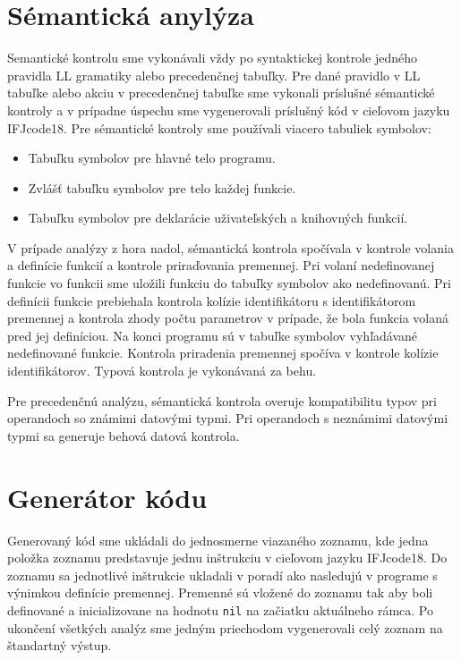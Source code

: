 \documentclass[a4paper, 11pt]{article}
\begin{document}
\section{Sémantická anylýza}
Semantické kontrolu sme vykonávali vždy po syntaktickej kontrole jedného pravidla LL gramatiky alebo precedenčnej tabuľky. Pre dané pravidlo v LL tabuľke alebo akciu v precedenčnej tabuľke sme vykonali príslušné sémantické kontroly a v prípadne úspechu sme vygenerovali príslušný kód v cieľovom jazyku IFJcode18. Pre sémantické kontroly sme používali viacero tabuliek symbolov:
\begin{itemize}
	\item Tabuľku symbolov pre hlavné telo programu.
	\item Zvlášť tabuľku symbolov pre telo každej funkcie.
	\item Tabuľku symbolov pre deklarácie uživateľských a knihovných funkcií.
\end{itemize}

V prípade analýzy z hora nadol, sémantická kontrola spočívala v kontrole volania a definície funkcií a kontrole priraďovania premennej.
Pri volaní nedefinovanej funkcie vo funkcii sme uložili funkciu do tabuľky symbolov ako nedefinovanú. Pri definícii funkcie
prebiehala kontrola kolízie identifikátoru s identifikátorom premennej a kontrola zhody počtu parametrov v prípade, že
bola funkcia volaná pred jej definíciou. Na konci programu sú v tabuľke symbolov vyhľadávané nedefinované funkcie.
Kontrola priradenia premennej spočíva v kontrole kolízie identifikátorov. Typová kontrola je vykonávaná za behu.

Pre precedenčnú analýzu, sémantická kontrola overuje kompatibilitu typov pri operandoch so známimi datovými typmi. Pri operandoch s neznámimi datovými typmi sa generuje behová datová kontrola.
\section{Generátor kódu}
Generovaný kód sme ukládali do jednosmerne viazaného zoznamu, kde jedna položka zoznamu predstavuje jednu inštrukciu v cieľovom jazyku IFJcode18. Do zoznamu sa jednotlivé inštrukcie ukladali v poradí ako nasledujú v programe s výnimkou definície premennej. Premenné sú vložené do zoznamu tak aby boli definované a inicializovane na hodnotu \texttt{nil} na začiatku aktuálneho rámca. Po ukončení všetkých analýz sme jedným priechodom vygenerovali celý zoznam na štandartný výstup.
\end{document}
